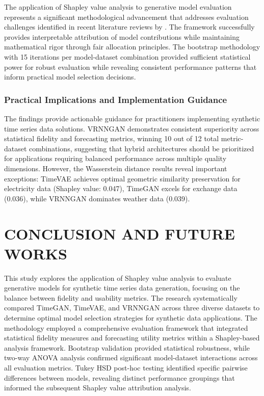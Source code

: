 \documentclass{article}
\begin{document}
The application of Shapley value analysis to generative model evaluation represents a significant methodological advancement that addresses evaluation challenges identified in recent literature reviews by \textcite{goyal_systematic_2024}. The framework successfully provides interpretable attribution of model contributions while maintaining mathematical rigor through fair allocation principles. The bootstrap methodology with 15 iterations per model-dataset combination provided sufficient statistical power for robust evaluation while revealing consistent performance patterns that inform practical model selection decisions.

\subsubsection*{Practical Implications and Implementation Guidance}

The findings provide actionable guidance for practitioners implementing synthetic time series data solutions. VRNNGAN demonstrates consistent superiority across statistical fidelity and forecasting metrics, winning 10 out of 12 total metric-dataset combinations, suggesting that hybrid architectures should be prioritized for applications requiring balanced performance across multiple quality dimensions. However, the Wasserstein distance results reveal important exceptions: TimeVAE achieves optimal geometric similarity preservation for electricity data (Shapley value: 0.047), TimeGAN excels for exchange data (0.036), while VRNNGAN dominates weather data (0.039).

\newpage
\section{CONCLUSION AND FUTURE WORKS}
This study explores the application of Shapley value analysis to evaluate generative models for synthetic time series data generation, focusing on the balance between fidelity and usability metrics. The research systematically compared TimeGAN, TimeVAE, and VRNNGAN across three diverse datasets to determine optimal model selection strategies for synthetic data applications. The methodology employed a comprehensive evaluation framework that integrated statistical fidelity measures and forecasting utility metrics within a Shapley-based analysis framework. Bootstrap validation provided statistical robustness, while two-way ANOVA analysis confirmed significant model-dataset interactions across all evaluation metrics. Tukey HSD post-hoc testing identified specific pairwise differences between models, revealing distinct performance groupings that informed the subsequent Shapley value attribution analysis.
\end{document}
